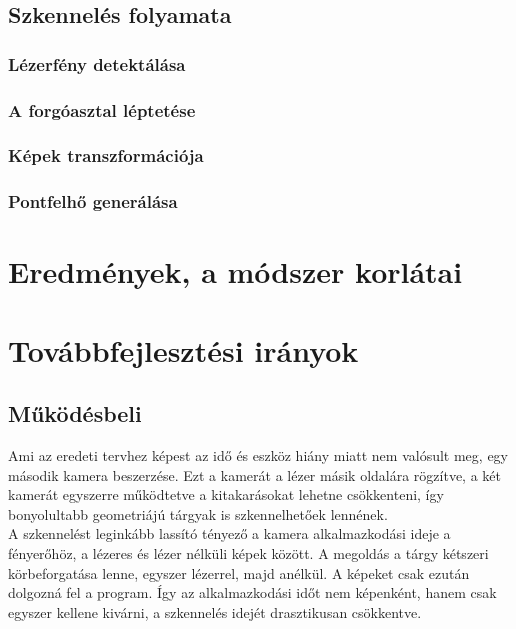 \documentclass[12pt,a4paper]{article}
\begin{document}
\subsection{Szkennelés folyamata}
\subsubsection{Lézerfény detektálása}
\subsubsection{A forgóasztal léptetése}
\subsubsection{Képek transzformációja}
\subsubsection{Pontfelhő generálása}
\section{Eredmények, a módszer korlátai}
\section{Továbbfejlesztési irányok}
\subsection{Működésbeli}
Ami az eredeti tervhez képest az idő és eszköz hiány miatt nem valósult meg, egy második kamera beszerzése. Ezt a kamerát a lézer másik oldalára rögzítve, a két kamerát egyszerre működtetve a kitakarásokat lehetne csökkenteni, így bonyolultabb geometriájú tárgyak is szkennelhetőek lennének.
\\[10pt]
A szkennelést leginkább lassító tényező a kamera alkalmazkodási ideje a fényerőhöz, a lézeres és lézer nélküli képek között. A megoldás a tárgy kétszeri körbeforgatása lenne, egyszer lézerrel, majd anélkül. A képeket csak ezután dolgozná fel a program. Így az alkalmazkodási időt nem képenként, hanem csak egyszer kellene kivárni, a szkennelés idejét drasztikusan csökkentve.
\end{document}
